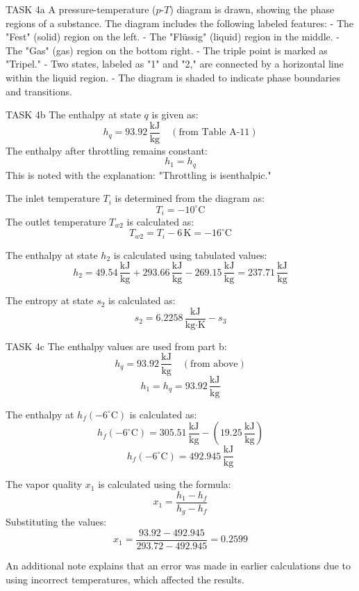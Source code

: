 TASK 4a  
A pressure-temperature (\(p\)-\(T\)) diagram is drawn, showing the phase regions of a substance. The diagram includes the following labeled features:  
- The "Fest" (solid) region on the left.  
- The "Flüssig" (liquid) region in the middle.  
- The "Gas" (gas) region on the bottom right.  
- The triple point is marked as "Tripel."  
- Two states, labeled as "1" and "2," are connected by a horizontal line within the liquid region.  
- The diagram is shaded to indicate phase boundaries and transitions.  

TASK 4b  
The enthalpy at state \(q\) is given as:  
\[
h_q = 93.92 \, \frac{\text{kJ}}{\text{kg}} \quad (\text{from Table A-11})
\]  
The enthalpy after throttling remains constant:  
\[
h_1 = h_q
\]  
This is noted with the explanation: "Throttling is isenthalpic."  

The inlet temperature \(T_i\) is determined from the diagram as:  
\[
T_i = -10^\circ\text{C}
\]  
The outlet temperature \(T_{w2}\) is calculated as:  
\[
T_{w2} = T_i - 6 \, \text{K} = -16^\circ\text{C}
\]  

The enthalpy at state \(h_2\) is calculated using tabulated values:  
\[
h_2 = 49.54 \, \frac{\text{kJ}}{\text{kg}} + 293.66 \, \frac{\text{kJ}}{\text{kg}} - 269.15 \, \frac{\text{kJ}}{\text{kg}} = 237.71 \, \frac{\text{kJ}}{\text{kg}}
\]  

The entropy at state \(s_2\) is calculated as:  
\[
s_2 = 6.2258 \, \frac{\text{kJ}}{\text{kg·K}} - s_3
\]  

TASK 4c  
The enthalpy values are used from part b:  
\[
h_q = 93.92 \, \frac{\text{kJ}}{\text{kg}} \quad (\text{from above})
\]  
\[
h_1 = h_q = 93.92 \, \frac{\text{kJ}}{\text{kg}}
\]  

The enthalpy at \(h_f(-6^\circ\text{C})\) is calculated as:  
\[
h_f(-6^\circ\text{C}) = 305.51 \, \frac{\text{kJ}}{\text{kg}} - (19.25 \, \frac{\text{kJ}}{\text{kg}})
\]  
\[
h_f(-6^\circ\text{C}) = 492.945 \, \frac{\text{kJ}}{\text{kg}}
\]  

The vapor quality \(x_1\) is calculated using the formula:  
\[
x_1 = \frac{h_1 - h_f}{h_g - h_f}
\]  
Substituting the values:  
\[
x_1 = \frac{93.92 - 492.945}{293.72 - 492.945} = 0.2599
\]  

An additional note explains that an error was made in earlier calculations due to using incorrect temperatures, which affected the results.